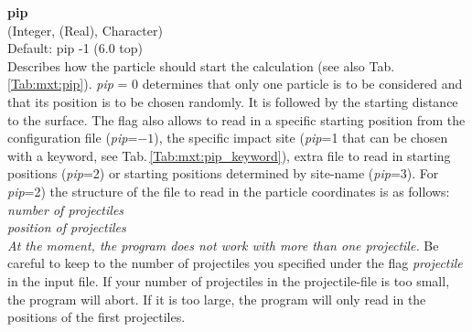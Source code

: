 \documentclass[twoside, 11pt, titlepage, captions=nooneline, a4paper, headsepline]{scrbook}%
\newcommand{\9}{\mathrm}
\newcommand{\0}{\,\mathrm}
\begin{document}
\noindent\textbf{pip}\\
(Integer, (Real), Character)\\
Default: pip -1 (6.0 top)\\
Describes how the particle should start the calculation (see also Tab.\,\ref{Tab:mxt:pip}). \textit{pip} = 0 determines that only one particle is to be considered and that its position is to be chosen randomly. It is followed by the starting distance to the surface. The flag also allows to read in a specific starting position from the configuration file (\textit{pip}=$-1$), the specific impact site (\textit{pip}=1 that can be chosen with a keyword, see Tab.\,\ref{Tab:mxt:pip_keyword}), extra file to read in starting positions (\textit{pip}=2) or starting positions determined by site-name (\textit{pip}=3). For \textit{pip}=2) the structure of the file to read in the particle coordinates is as follows:\\
\emph{number of projectiles}\\
\emph{position of projectiles}\\
\textit{At the moment, the program does not work with more than one projectile.} Be careful to keep to the number of projectiles you specified under the flag \emph{projectile} in the input file. If your number of projectiles in the projectile-file is too small, the program will abort. If it is too large, the program will only read in the positions of the first projectiles.\\
\end{document}
